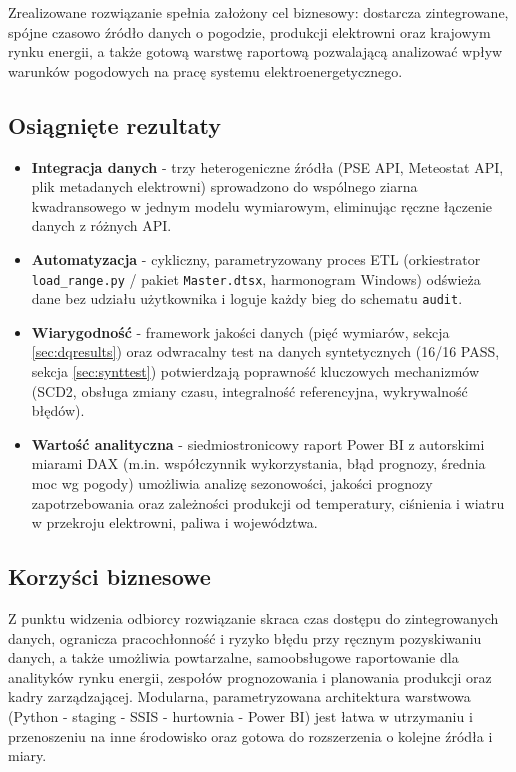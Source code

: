 \documentclass[12pt]{article}
\begin{document}
	Zrealizowane rozwiązanie spełnia założony cel biznesowy: dostarcza zintegrowane, spójne czasowo źródło danych o pogodzie, produkcji elektrowni oraz krajowym rynku energii, a także gotową warstwę raportową pozwalającą analizować wpływ warunków pogodowych na pracę systemu elektroenergetycznego.

	\subsection{Osiągnięte rezultaty}
	\begin{itemize}
		\item \textbf{Integracja danych} - trzy heterogeniczne źródła (PSE API, Meteostat API, plik metadanych elektrowni) sprowadzono do wspólnego ziarna kwadransowego w jednym modelu wymiarowym, eliminując ręczne łączenie danych z różnych API.
		\item \textbf{Automatyzacja} - cykliczny, parametryzowany proces ETL (orkiestrator \texttt{load\_range.py} / pakiet \texttt{Master.dtsx}, harmonogram Windows) odświeża dane bez udziału użytkownika i loguje każdy bieg do schematu \texttt{audit}.
		\item \textbf{Wiarygodność} - framework jakości danych (pięć wymiarów, sekcja \ref{sec:dqresults}) oraz odwracalny test na danych syntetycznych (16/16 PASS, sekcja \ref{sec:synttest}) potwierdzają poprawność kluczowych mechanizmów (SCD2, obsługa zmiany czasu, integralność referencyjna, wykrywalność błędów).
		\item \textbf{Wartość analityczna} - siedmiostronicowy raport Power BI z autorskimi miarami DAX (m.in. współczynnik wykorzystania, błąd prognozy, średnia moc wg pogody) umożliwia analizę sezonowości, jakości prognozy zapotrzebowania oraz zależności produkcji od temperatury, ciśnienia i wiatru w przekroju elektrowni, paliwa i województwa.
	\end{itemize}

	\subsection{Korzyści biznesowe}
	Z punktu widzenia odbiorcy rozwiązanie skraca czas dostępu do zintegrowanych danych, ogranicza pracochłonność i ryzyko błędu przy ręcznym pozyskiwaniu danych, a także umożliwia powtarzalne, samoobsługowe raportowanie dla analityków rynku energii, zespołów prognozowania i planowania produkcji oraz kadry zarządzającej. Modularna, parametryzowana architektura warstwowa (Python - staging - SSIS - hurtownia - Power BI) jest łatwa w utrzymaniu i przenoszeniu na inne środowisko oraz gotowa do rozszerzenia o kolejne źródła i miary.
\end{document}

